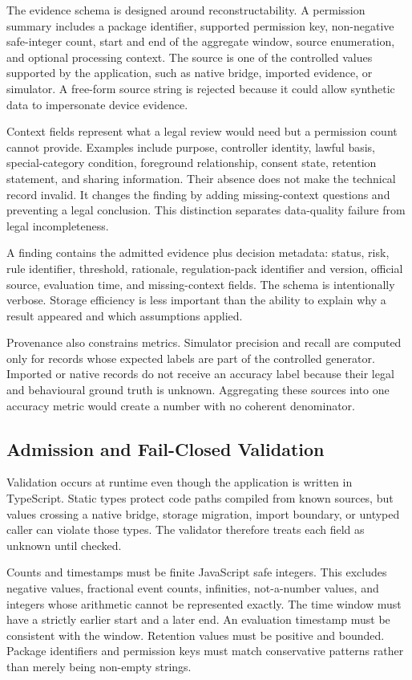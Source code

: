 The evidence schema is designed around reconstructability. A permission summary includes a package identifier, supported permission key, non-negative safe-integer count, start and end of the aggregate window, source enumeration, and optional processing context. The source is one of the controlled values supported by the application, such as native bridge, imported evidence, or simulator. A free-form source string is rejected because it could allow synthetic data to impersonate device evidence.

Context fields represent what a legal review would need but a permission count cannot provide. Examples include purpose, controller identity, lawful basis, special-category condition, foreground relationship, consent state, retention statement, and sharing information. Their absence does not make the technical record invalid. It changes the finding by adding missing-context questions and preventing a legal conclusion. This distinction separates data-quality failure from legal incompleteness.

A finding contains the admitted evidence plus decision metadata: status, risk, rule identifier, threshold, rationale, regulation-pack identifier and version, official source, evaluation time, and missing-context fields. The schema is intentionally verbose. Storage efficiency is less important than the ability to explain why a result appeared and which assumptions applied.

Provenance also constrains metrics. Simulator precision and recall are computed only for records whose expected labels are part of the controlled generator. Imported or native records do not receive an accuracy label because their legal and behavioural ground truth is unknown. Aggregating these sources into one accuracy metric would create a number with no coherent denominator.

\subsection{Admission and Fail-Closed Validation}

Validation occurs at runtime even though the application is written in TypeScript. Static types protect code paths compiled from known sources, but values crossing a native bridge, storage migration, import boundary, or untyped caller can violate those types. The validator therefore treats each field as unknown until checked.

Counts and timestamps must be finite JavaScript safe integers. This excludes negative values, fractional event counts, infinities, not-a-number values, and integers whose arithmetic cannot be represented exactly. The time window must have a strictly earlier start and a later end. An evaluation timestamp must be consistent with the window. Retention values must be positive and bounded. Package identifiers and permission keys must match conservative patterns rather than merely being non-empty strings.

